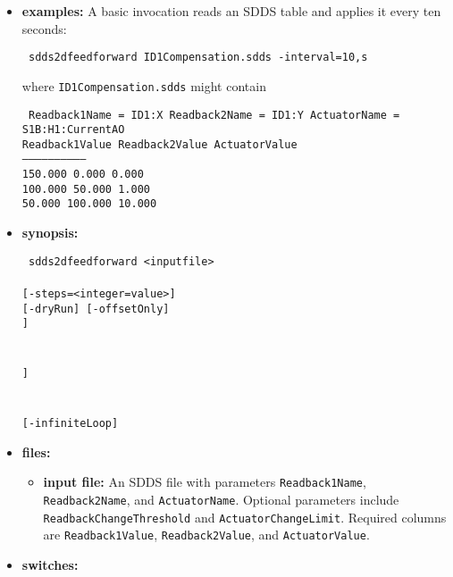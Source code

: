 \begin{itemize}
\item {\bf examples:}
A basic invocation reads an SDDS table and applies it every ten seconds:
\begin{flushleft}{\tt
sdds2dfeedforward ID1Compensation.sdds -interval=10,s
}\end{flushleft}
where \verb+ID1Compensation.sdds+ might contain
\begin{flushleft}{\tt
Readback1Name = ID1:X \quad Readback2Name = ID1:Y \quad ActuatorName = S1B:H1:CurrentAO\\
 Readback1Value  Readback2Value  ActuatorValue\\
------------------------------\\
       150.000       0.000          0.000\\
       100.000      50.000          1.000\\
        50.000     100.000         10.000\\
}\end{flushleft}
\item {\bf synopsis:}
\begin{flushleft}{\tt
sdds2dfeedforward <inputfile> \\
       [-controlLog=<rootname>] \\
       [-interval=<real-value>] [-steps=<integer=value>]\\
       [-verbose] [-dryRun] [-offsetOnly]\\
       [-averageOf=<number>[,interval=<seconds>]] \\
       [-advance=<seconds>] \\
       [-testValues=<SDDSfile>]\\
       [-runControlPV=string=<string>[,pingTimeout=<value>]] \\
       [-runControlDescription=<string>]\\
       [-CASecurityTest] \\
       [-pendIOtime=<seconds>] [-infiniteLoop]
}\end{flushleft}
\item {\bf files:}
\begin{itemize}
  \item {\bf input file:} An SDDS file with parameters \verb+Readback1Name+,
  \verb+Readback2Name+, and \verb+ActuatorName+.  Optional parameters include
  \verb+ReadbackChangeThreshold+ and \verb+ActuatorChangeLimit+.  Required
  columns are \verb+Readback1Value+, \verb+Readback2Value+, and
  \verb+ActuatorValue+.
\end{itemize}
\item {\bf switches:}

\end{itemize}
